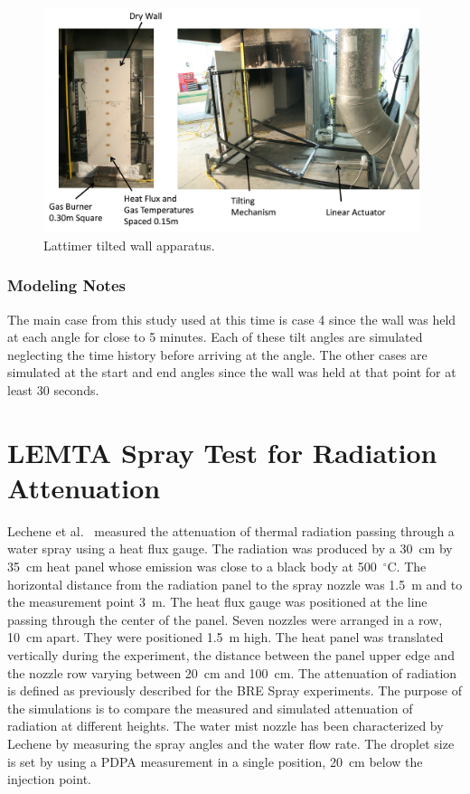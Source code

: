 \begin{figure}[h!]
\includegraphics[width=0.98\textwidth]{FIGURES/Lattimer_Tilted_Wall/lattimer_tilted_wall_apparatus}
\caption[Lattimer tilted wall apparatus]{Lattimer tilted wall apparatus.}
\label{Lattimer_Tilted_Wall_fig}
\end{figure}

\subsubsection{Modeling Notes}

The main case from this study used at this time is case 4 since the wall was held at each angle for close to 5 minutes.
Each of these tilt angles are simulated neglecting the time history before arriving at the angle.
The other cases are simulated at the start and end angles since the wall was held at that point for at least 30 seconds.


\section{LEMTA Spray Test for Radiation Attenuation}
\label{LEMTA_Spray_Description}

Lechene et al.~\cite{Lechene} measured the attenuation of thermal radiation passing through a water spray using a heat flux gauge. The radiation was produced by a 30~cm by 35~cm heat panel whose emission was close to a black body at 500~$^\circ$C. The horizontal distance from the radiation panel to the spray nozzle was 1.5~m and to the measurement point 3~m. The heat flux gauge was positioned at the line passing through the center of the panel. Seven nozzles were arranged in a row, 10~cm apart. They were positioned 1.5~m high. The heat panel was translated vertically during the experiment, the distance between the panel upper edge and the nozzle row varying between 20~cm and 100~cm. The attenuation of radiation is defined as previously described for the BRE Spray experiments. The purpose of the simulations is to compare the measured and simulated attenuation of radiation at different heights. The water mist nozzle has been characterized by Lechene by measuring the spray angles and the water flow rate. The droplet size is set by using a PDPA measurement in a single position, 20~cm below the injection point.


